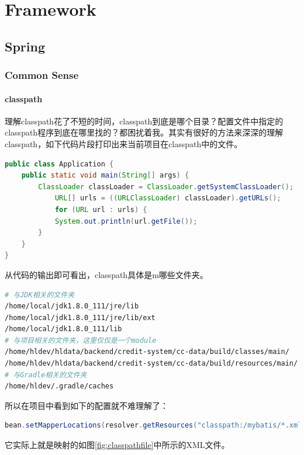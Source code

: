 \documentclass[letter]{book}
\begin{document}
\tableofcontents




\part{Framework}

\chapter{Spring}

\section{Common Sense}

\subsection{classpath}

理解classpath花了不短的时间，classpath到底是哪个目录？配置文件中指定的classpath程序到底在哪里找的？都困扰着我。其实有很好的方法来深深的理解classpath，如下代码片段打印出来当前项目在classpath中的文件。

\begin{lstlisting}[language=Java]
public class Application {
	public static void main(String[] args) {
		ClassLoader classLoader = ClassLoader.getSystemClassLoader();
			URL[] urls = ((URLClassLoader) classLoader).getURLs();
			for (URL url : urls) {
			System.out.println(url.getFile());
		}
	}
}
\end{lstlisting}

从代码的输出即可看出，classpath具体是m哪些文件夹。

\begin{lstlisting}[language=Bash]
# 与JDK相关的文件夹
/home/local/jdk1.8.0_111/jre/lib
/home/local/jdk1.8.0_111/jre/lib/ext
/home/local/jdk1.8.0_111/lib
# 与项目相关的文件夹，这里仅仅是一个module
/home/hldev/hldata/backend/credit-system/cc-data/build/classes/main/
/home/hldev/hldata/backend/credit-system/cc-data/build/resources/main/
# 与Gradle相关的文件夹
/home/hldev/.gradle/caches
\end{lstlisting}

所以在项目中看到如下的配置就不难理解了：

\begin{lstlisting}[language=Java]
bean.setMapperLocations(resolver.getResources("classpath:/mybatis/*.xml"));
\end{lstlisting}
它实际上就是映射的如图\ref{fig:classpathfile}中所示的XML文件。
\end{document}
